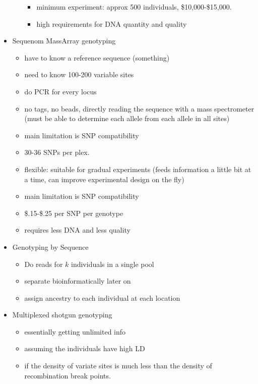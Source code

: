 \documentclass{article}
\begin{document}
\begin{itemize}
\begin{itemize}
\begin{itemize}
                \item minimum experiment: approx 500 individuals, \$10,000-\$15,000.
                \item high requirements for DNA quantity and quality
            \end{itemize}
        \end{itemize}
        \item Sequenom MassArray genotyping
        \begin{itemize}
            \item have to know a reference sequence (something)
            \item need to know 100-200 variable sites
            \item do PCR for every locus
            \item no tags, no beads, directly reading the sequence with a mass spectrometer (must be able to determine each allele from each allele in all sites)
            \item main limitation is SNP compatibility
            \item 30-36 SNPs per plex.
            \item flexible: suitable for gradual experiments (feeds information a little bit at a time, can improve experimental design on the fly)
            \item main limitation is SNP compatibility
            \item \$.15-\$.25 per SNP per genotype
            \item requires less DNA and less quality
        \end{itemize}
        \item Genotyping by Sequence
        \begin{itemize}
            \item Do reads for $k$ individuals in a single pool
            \item separate bioinformatically later on
            \item assign ancestry to each individual at each location
        \end{itemize}
        \item Multiplexed shotgun genotyping
        \begin{itemize}
            \item essentially getting unlimited info
            \item assuming the individuals have high LD
            \item if the density of variate sites is much less than the density of recombination break points.

\end{itemize}
\end{itemize}
\end{document}
